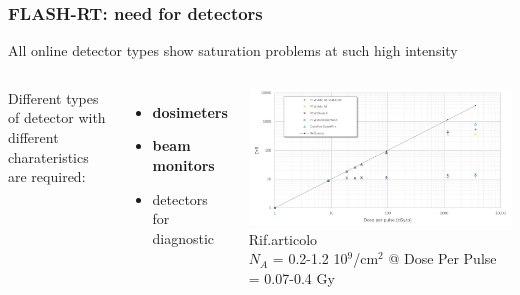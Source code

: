     \begin{frame}
        \frametitle{FLASH-RT: need for detectors}
        All online detector types show saturation problems at such high intensity
        \medskip
        \begin{columns}
            Different types of detector with different charateristics are required: 
                \begin{itemize}
                    \item \textbf{dosimeters} 
                    \item \textbf{beam monitors} 
                    \item detectors for diagnostic 
                \end{itemize}
                \hspace*{-0.6cm}
                \includegraphics[width=1.15\linewidth]{figures/pixel_detectors_usage/saturation_dosimeters.pdf}
                Rif.articolo\\\bigskip
                \hspace*{-3.cm}$N_A$ = 0.2-1.2 10$^9$/cm$^2$ @ Dose Per Pulse = 0.07-0.4 Gy
        \end{columns}
    \end{frame}     



